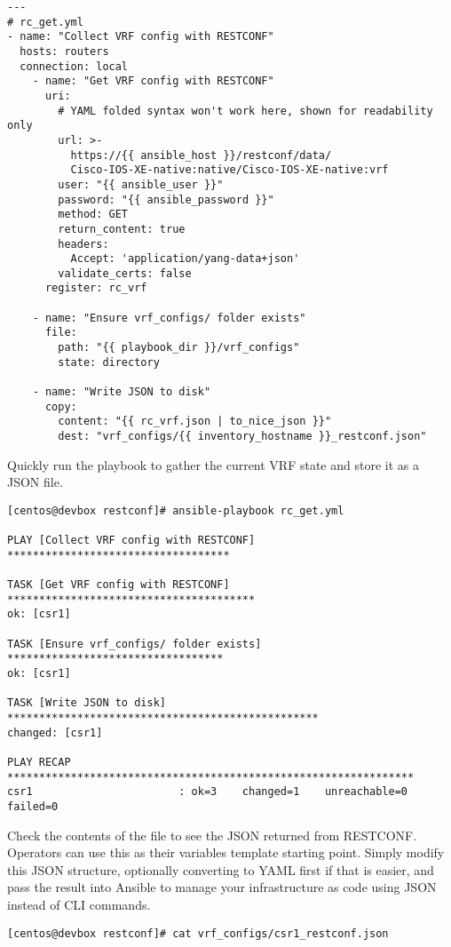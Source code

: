 \begin{verbatim}
---
# rc_get.yml
- name: "Collect VRF config with RESTCONF"
  hosts: routers
  connection: local
    - name: "Get VRF config with RESTCONF"
      uri:
        # YAML folded syntax won't work here, shown for readability only
        url: >-
          https://{{ ansible_host }}/restconf/data/
          Cisco-IOS-XE-native:native/Cisco-IOS-XE-native:vrf
        user: "{{ ansible_user }}"
        password: "{{ ansible_password }}"
        method: GET
        return_content: true
        headers:
          Accept: 'application/yang-data+json'
        validate_certs: false
      register: rc_vrf

    - name: "Ensure vrf_configs/ folder exists"
      file:
        path: "{{ playbook_dir }}/vrf_configs"
        state: directory

    - name: "Write JSON to disk"
      copy:
        content: "{{ rc_vrf.json | to_nice_json }}"
        dest: "vrf_configs/{{ inventory_hostname }}_restconf.json"
\end{verbatim}

Quickly run the playbook to gather the current VRF state and store it
as a JSON file.

\begin{verbatim}
[centos@devbox restconf]# ansible-playbook rc_get.yml

PLAY [Collect VRF config with RESTCONF] ***********************************

TASK [Get VRF config with RESTCONF] ***************************************
ok: [csr1]

TASK [Ensure vrf_configs/ folder exists] **********************************
ok: [csr1]

TASK [Write JSON to disk] *************************************************
changed: [csr1]

PLAY RECAP ****************************************************************
csr1                       : ok=3    changed=1    unreachable=0    failed=0
\end{verbatim}

Check the contents of the file to see the JSON returned from RESTCONF\@.
Operators can use this as their variables template starting point. Simply
modify this JSON structure, optionally converting to YAML first if that
is easier, and pass the result into Ansible to manage your infrastructure
as code using JSON instead of CLI commands.

\begin{verbatim}
[centos@devbox restconf]# cat vrf_configs/csr1_restconf.json
\end{verbatim}

